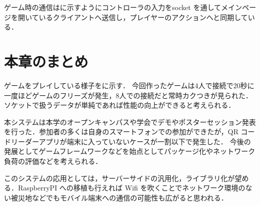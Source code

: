 ゲーム時の通信はに示すようにコントローラの入力をsocket を通してメインページを開いているクライアントへ送信し，プレイヤーのアクションへと同期している．



\newpage

\section{本章のまとめ}
ゲームをプレイしている様子をに示す．
今回作ったゲームは4人で接続で20秒に一度ほどゲームのフリーズが発生，8人での接続だと常時カクつきが見られた．ソケットで扱うデータが単純であれば性能の向上ができると考えられる．

本システムは本学のオープンキャンパスや学会でデモやポスターセッション発表を行った．参加者の多くは自身のスマートフォンでの参加ができたが，QR コードリーダーアプリが端末に入っていないケースが一割以下で発生した．
今後の発展としてゲームフレームワークなどを始点としてパッケージ化やネットワーク負荷の評価などを考えられる．


このシステムの応用としては，サーバーサイドの汎用化，ライブラリ化が望める．RaspberryPI への移植も行えれば Wifi を吹くことでネットワーク環境のない被災地などでもモバイル端末への通信の可能性も広がると思われる．

\newpage
